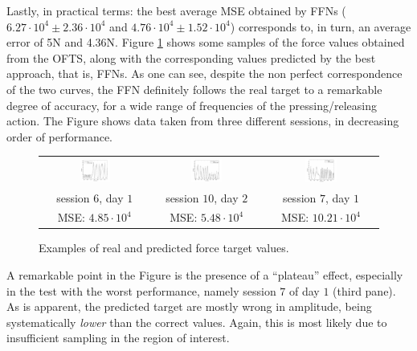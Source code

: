 Lastly, in practical terms: the best average MSE obtained by FFNs
($6.27\cdot 10^4 \pm 2.36\cdot 10^4$ and $4.76\cdot 10^4 \pm 1.52\cdot
10^4$) corresponds to, in turn, an average error of 5N and
4.36N. Figure \ref{fig:regression} shows some samples of the force
values obtained from the OFTS, along with the corresponding values
predicted by the best approach, that is, FFNs. As one can see, despite
the non perfect correspondence of the two curves, the FFN definitely
follows the real target to a remarkable degree of accuracy, for a wide
range of frequencies of the pressing/releasing action. The Figure
shows data taken from three different sessions, in decreasing order of
performance.

\begin{figure}[!ht] \centering
  \begin{tabular}{ccc}
    \includegraphics[width=0.30\textwidth]{figs/fig_regression1.png} &
    \includegraphics[width=0.30\textwidth]{figs/fig_regression2.png} &
    \includegraphics[width=0.30\textwidth]{figs/fig_regression3.png} \\
    session $6$, day $1$ & session $10$, day $2$ & session $7$, day $1$ \\
    MSE: $4.85\cdot 10^4$ & MSE: $5.48\cdot 10^4$ & MSE: $10.21\cdot 10^4$ \\
  \end{tabular}
  \caption{Examples of real and predicted force target values.}
  \label{fig:regression}
\end{figure}

A remarkable point in the Figure is the presence of a ``plateau''
effect, especially in the test with the worst performance, namely
session $7$ of day $1$ (third pane). As is apparent, the predicted
target are mostly wrong in amplitude, being systematically
\emph{lower} than the correct values. Again, this is most likely due
to insufficient sampling in the region of interest.
